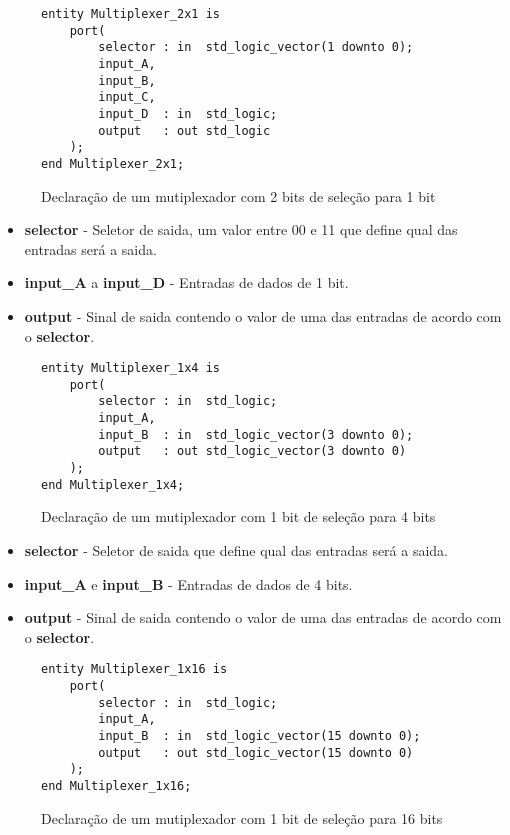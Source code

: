 \documentclass{article}
\begin{document}
				\begin{figure}[H]
					\centering
					\caption[Mutiplexador com 2 bits de sele\c{c}\~{a}o para 1 bit]{Declara\c{c}\~{a}o de um mutiplexador com 2 bits de sele\c{c}\~{a}o para 1 bit}
					\label{fig:Multiplexer_2x1}
					\begin{lstlisting}[style=vhdl]
entity Multiplexer_2x1 is
	port(
		selector : in  std_logic_vector(1 downto 0);
		input_A,
		input_B,
		input_C,
		input_D  : in  std_logic;
		output   : out std_logic
	);
end Multiplexer_2x1;
					\end{lstlisting}
				\end{figure}
				\begin{itemize}
					\item \textbf{selector} - Seletor de saida, um valor entre 00 e 11 que define qual das entradas ser\'{a} a saida.
					\item \textbf{input\_A} a \textbf{input\_D} - Entradas de dados de 1 bit.
					\item \textbf{output} - Sinal de saida contendo o valor de uma das entradas de acordo com o \textbf{selector}.
				\end{itemize}
				\begin{figure}[H]
					\centering
					\caption[Mutiplexador com 1 bit de sele\c{c}\~{a}o para 4 bits]{Declara\c{c}\~{a}o de um mutiplexador com 1 bit de sele\c{c}\~{a}o para 4 bits}
					\label{fig:Multiplexer_1x4}
					\begin{lstlisting}[style=vhdl]
entity Multiplexer_1x4 is
	port(
		selector : in  std_logic;
		input_A,
		input_B  : in  std_logic_vector(3 downto 0);
		output   : out std_logic_vector(3 downto 0)
	);
end Multiplexer_1x4;
					\end{lstlisting}
				\end{figure}
				\begin{itemize}
					\item \textbf{selector} - Seletor de saida que define qual das entradas ser\'{a} a saida.
					\item \textbf{input\_A} e \textbf{input\_B} - Entradas de dados de 4 bits.
					\item \textbf{output} - Sinal de saida contendo o valor de uma das entradas de acordo com o \textbf{selector}.
				\end{itemize}
				\begin{figure}[H]
					\centering
					\caption[Mutiplexador com 1 bit de sele\c{c}\~{a}o para 16 bits]{Declara\c{c}\~{a}o de um mutiplexador com 1 bit de sele\c{c}\~{a}o para 16 bits}
					\label{fig:Multiplexer_1x16}
					\begin{lstlisting}[style=vhdl]
entity Multiplexer_1x16 is
	port(
		selector : in  std_logic;
		input_A,
		input_B  : in  std_logic_vector(15 downto 0);
		output   : out std_logic_vector(15 downto 0)
	);
end Multiplexer_1x16;
					\end{lstlisting}
				\end{figure}
\end{document}
